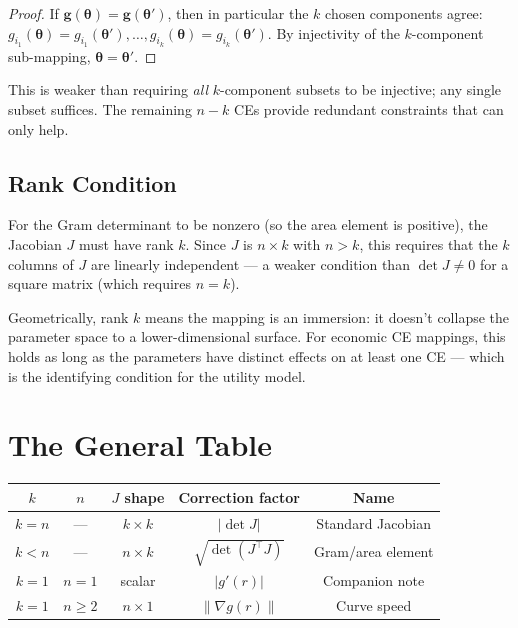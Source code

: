 \documentclass[11pt,a4paper]{article}
\theoremstyle{definition}
\newcommand{\btheta}{\boldsymbol{\theta}}
\begin{document}
\begin{proof}
If $\mathbf{g}(\btheta) = \mathbf{g}(\btheta')$, then in particular the $k$
chosen components agree: $g_{i_1}(\btheta) = g_{i_1}(\btheta'), \ldots,
g_{i_k}(\btheta) = g_{i_k}(\btheta')$. By injectivity of the $k$-component
sub-mapping, $\btheta = \btheta'$.
\end{proof}

This is weaker than requiring \emph{all} $k$-component subsets to be
injective; any single subset suffices. The remaining $n - k$ CEs provide
redundant constraints that can only help.

\subsection{Rank Condition}

For the Gram determinant to be nonzero (so the area element is positive), the
Jacobian $J$ must have rank $k$. Since $J$ is $n \times k$ with $n > k$, this
requires that the $k$ columns of $J$ are linearly independent --- a weaker
condition than $\det J \neq 0$ for a square matrix (which requires $n = k$).

Geometrically, rank $k$ means the mapping is an immersion: it doesn't
collapse the parameter space to a lower-dimensional surface. For economic CE
mappings, this holds as long as the parameters have distinct effects on
at least one CE --- which is the identifying condition for the utility model.


\section{The General Table}
\label{sec:table}

\begin{center}
\begin{tabular}{ccccc}
\toprule
$k$ & $n$ & $J$ shape & Correction factor & Name \\
\midrule
$k = n$ & --- & $k \times k$ & $|\!\det J|$ & Standard Jacobian \\
$k < n$ & --- & $n \times k$ & $\sqrt{\det(J^\top J)}$ & Gram/area element \\
$k = 1$ & $n = 1$ & scalar & $|g'(r)|$ & Companion note \\
$k = 1$ & $n \geq 2$ & $n \times 1$ & $\|\nabla g(r)\|$ & Curve speed \\
\bottomrule
\end{tabular}
\end{center}
\end{document}
